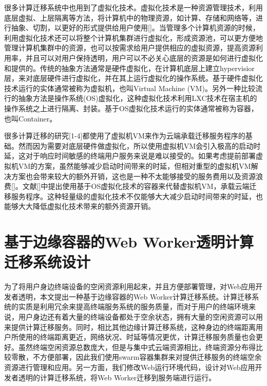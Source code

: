 很多计算迁移系统中也用到了虚拟化技术。虚拟化技术是一种资源管理技术，利用底层虚拟、上层隔离等方法，将计算机中的物理资源，如计算、存储和网络等，进行抽象、切割，以更好的形式提供给用户使用[]。当管理多个计算机资源的时候，利用虚拟化技术还可以将整个计算机集群进行虚拟化，形成资源池，可以更方便地管理计算机集群中的资源，也可以按需求给用户提供相应的虚拟资源，提高资源利用率，并且可以对用户保持透明，用户可以不必关心底层的资源是如何进行虚拟化和提供的。传统的抽象方法通常是硬件虚拟化，在计算机底层上建立hypervisior层，来对底层硬件进行虚拟化，并在其上运行虚拟化的操作系统。基于硬件虚拟化技术运行的实体通常被称为虚拟机，也叫Virtual Machine (VM)。另外一种比较流行的抽象方法是操作系统(OS)虚拟化，这种虚拟化技术利用LXC技术在宿主机的操作系统之上进行隔离、封装。基于OS虚拟化技术运行的实体通常被称为容器，也叫Container。

很多计算迁移的研究[1-4]都使用了虚拟机VM来作为云端承载迁移服务程序的基础。然而因为需要对底层硬件做虚拟化，所以使用虚拟机VM会引入极高的启动时延，这对于响应时间敏感的终端用户服务来说是难以接受的。如果考虑提前部署虚拟机VM的方案，虽然能够减少启动时间带来的时延，但相对重型的虚拟机VM解决方案也会带来较大的额外开销，这也是一种不太能够接受的服务费用以及资源浪费[]。文献[]中提出使用基于OS虚拟化技术的容器来代替虚拟机VM，承载云端迁移服务程序。这种轻量级的虚拟化技术不仅能够大大减少启动时间带来的时延，也能够大大降低虚拟化技术带来的额外资源开销。
\section{基于边缘容器的Web Worker透明计算迁移系统设计}

为了将用户身边终端设备的空闲资源利用起来，并且方便部署管理，对Web应用开发者透明，本文提出一种基于边缘容器的Web Worker计算迁移系统。计算迁移系统的实质是利用冗余来提高终端服务系统的服务质量，而对于用户的终端环境来说，用户身边还有着大量的终端设备都处于空余状态，拥有大量的空闲资源可以用来提供计算迁移服务。同时，相比其他边缘计算迁移系统，这种身边的终端距离用户所使用的终端距离更近，网络状况、时延等情况更优，计算迁移服务质量也会更好。虽然终端空闲资源总数庞大，但是与集中式云端资源相比，终端资源分布得比较零散，不方便部署，因此我们使用swarm容器集群来对提供迁移服务的终端空余资源进行管理和应用。另一方面，我们修改Web运行环境代码，设计对Web应用开发者透明的计算迁移系统，将Web Worker迁移到服务端进行运行。
